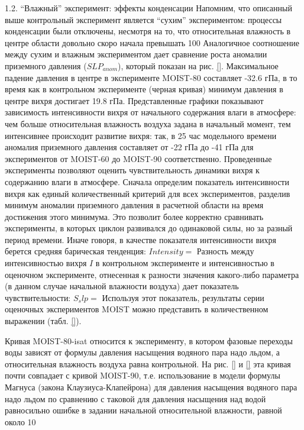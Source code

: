 1.2.	 “Влажный” эксперимент: эффекты конденсации
Напомним, что описанный выше контрольный эксперимент является “сухим” экспериментом: процессы конденсации были отключены, несмотря на то, что относительная влажность в центре области довольно скоро начала превышать 100%
Аналогичное соотношение между сухим и влажным экспериментом дает сравнение роста аномалии приземного давления ($SLP_{anom}$), который показан на рис. \ref{}. Максимальное падение давления в центре в эксперименте MOIST-80 составляет -32.6 гПа, в то время как в контрольном эксперименте (черная кривая) минимум давления в центре вихря достигает 19.8 гПа.
Представленные графики показывают зависимость интенсивности вихря от начального содержания влаги в атмосфере: чем больше относительная влажность воздуха задана в начальный момент, тем интенсивнее происходит развитие вихря: так, в  25 час модельного времени аномалия приземного давления составляет от -22 гПа до -41 гПа для экспериментов от MOIST-60 до MOIST-90 соответственно.
Проведенные эксперименты позволяют оценить чувствительность динамики вихря к содержанию влаги в атмосфере. Сначала определим показатель интенсивности вихря как единый количественный критерий для всех экспериментов, разделив минимум аномалии приземного давления в расчетной области на время достижения этого минимума. Это позволит более корректно сравнивать эксперименты, в которых циклон развивался до одинаковой силы, но за разный период времени. Иначе говоря, в качестве показателя интенсивности вихря берется средняя барическая тенденция:
$Intensity=$
Разность между интенсивностью вихря $I$ в контрольном эксперименте и интенсивностью в оценочном эксперименте, отнесенная к разности значения какого-либо параметра (в данном случае начальной влажности воздуха) дает показатель чувствительности:
$S_slp=$
Используя этот показатель, результаты серии оценочных экспериментов MOIST можно представить в количественном выражении (табл. \ref{}).
\begin{table}
\end{table}
Кривая MOIST-80-isat относится к эксперименту, в котором фазовые переходы воды зависят от формулы давления насыщения водяного пара надо льдом, а относительная влажность воздуха равна контрольной. На рис. \ref{} и \ref{} эта кривая почти совпадает с кривой MOIST-90, т.е. использование в модели формулы Магнуса (закона Клаузиуса-Клапейрона) для давления насыщения водяного пара надо льдом по сравнению с таковой для давления насыщения над водой равносильно ошибке в задании начальной относительной влажности, равной около 10%


